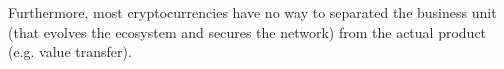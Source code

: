 Furthermore, most cryptocurrencies have no way to separated the business unit
(that evolves the ecosystem and secures the network) from the actual product
(e.g. value transfer).
